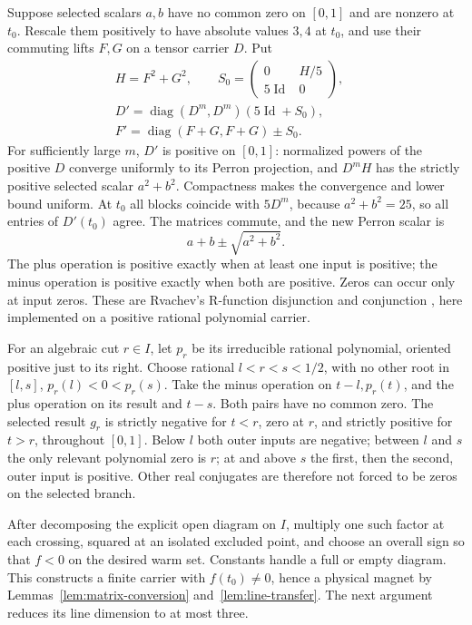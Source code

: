 Suppose selected scalars \(a,b\) have no common zero on \([0,1]\) and are nonzero at \(t_0\). Rescale them positively to have absolute values \(3,4\) at \(t_0\), and use their commuting lifts \(F,G\) on a tensor carrier \(D\). Put
\[
\begin{gathered}
H=F^2+G^2,\qquad
S_0=\begin{pmatrix}0&H/5\\5\operatorname{Id}&0\end{pmatrix},\quad
\\
D'=\operatorname{diag}(D^m,D^m)(5\operatorname{Id}+S_0),\\
F'=\operatorname{diag}(F+G,F+G)\mathbin{\pm}S_0.
\end{gathered}
\]
For sufficiently large \(m\), \(D'\) is positive on \([0,1]\): normalized powers of the positive \(D\) converge uniformly to its Perron projection, and \(D^mH\) has the strictly positive selected scalar \(a^2+b^2\). Compactness makes the convergence and lower bound uniform. At \(t_0\) all blocks coincide with \(5D^m\), because \(a^2+b^2=25\), so all entries of \(D'(t_0)\) agree. The matrices commute, and the new Perron scalar is
\[
a+b\pm\sqrt{a^2+b^2}.
\]
The plus operation is positive exactly when at least one input is positive; the minus operation is positive exactly when both are positive. Zeros can occur only at input zeros. These are Rvachev's R-function disjunction and conjunction \cite{shapiro}, here implemented on a positive rational polynomial carrier.

For an algebraic cut \(r\in I\), let \(p_r\) be its irreducible rational polynomial, oriented positive just to its right. Choose rational \(l<r<s<1/2\), with no other root in \([l,s]\), \(p_r(l)<0<p_r(s)\). Take the minus operation on \(t-l,p_r(t)\), and the plus operation on its result and \(t-s\). Both pairs have no common zero. The selected result \(g_r\) is strictly negative for \(t<r\), zero at \(r\), and strictly positive for \(t>r\), throughout \([0,1]\). Below \(l\) both outer inputs are negative; between \(l\) and \(s\) the only relevant polynomial zero is \(r\); at and above \(s\) the first, then the second, outer input is positive. Other real conjugates are therefore not forced to be zeros on the selected branch.

After decomposing the explicit open diagram on \(I\), multiply one such factor at each crossing, squared at an isolated excluded point, and choose an overall sign so that \(f<0\) on the desired warm set. Constants handle a full or empty diagram. This constructs a finite carrier with \(f(t_0)\ne0\), hence a physical magnet by Lemmas~\ref{lem:matrix-conversion} and~\ref{lem:line-transfer}. The next argument reduces its line dimension to at most three.

